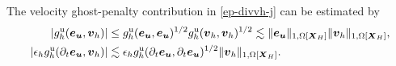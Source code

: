 \documentclass[11pt,reqno]{amsart}
\theoremstyle{definition}
\theoremstyle{plain}
\numberwithin{theorem}{section}
\numberwithin{proposition}{section}
\numberwithin{lemma}{section}
\numberwithin{equation}{section}
\newcommand{\bs}[1]{\boldsymbol{#1}}
\newcommand{\uu}[1]  {{\bs{#1}} }
\newcommand{\grad}   { \uu{\nabla}    }
\newcommand{\bu}{\uu{u}}
\renewcommand{\(}{\bigl(}
\renewcommand{\)}{\bigr)}
\newcommand{\MO}[1]{{\color{magenta} MO:  #1}}
\newcommand{\BL}[1]{{\color{blue} BL:  #1}}
\begin{document}
The velocity ghost-penalty contribution in \eqref{ep-divvh-j} can be estimated by
\begin{subequations}\label{eq:pressure-ghost-estimate}
\begin{align}
\left|
g_h^{\rm u}({\bs e}_{\bs u},{\bs v}_h)
\right|
&\le
g_h^{\rm u}({\bs e}_{\bs u},{\bs e}_{\bs u})^{1/2}
g_h^{\rm u}({\bs v}_h,{\bs v}_h)^{1/2} 
\lesssim
\|{\bs e}_{\bs u}\|_{1,\Omega[{\bs X}_H]}
\|{\bs v}_h\|_{1,\Omega[{\bs X}_H]} ,
\label{eq:pressure-velocity-ghost-estimate} \\
\left|\epsilon_h
g_h^{\rm u}(\partial_t{\bs e}_{\bs u},{\bs v}_h)
\right|
&\lesssim
\epsilon_h
g_h^{\rm u}(\partial_t{\bs e}_{\bs u},\partial_t{\bs e}_{\bs u})^{1/2}
\|{\bs v}_h\|_{1,\Omega[{\bs X}_H]}. 
\label{eq:pressure-mass-ghost-estimate}
\end{align}
\end{subequations}
\end{document}
